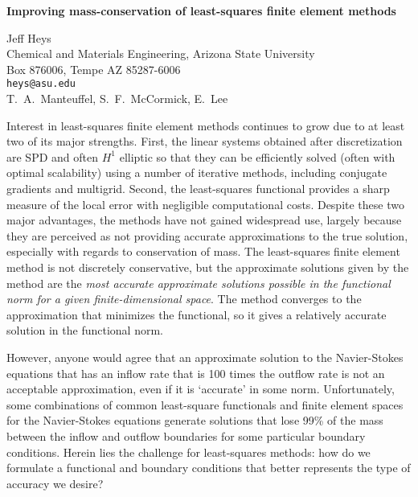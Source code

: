 \documentclass{report}
\begin{document}

\begin{center}
{\large
{\bf Improving mass-conservation of least-squares finite element methods}}

	Jeff Heys \\
	Chemical and Materials Engineering, Arizona State University \\
	Box 876006, Tempe AZ 85287-6006 \\
	{\tt heys@asu.edu} \\
	T.~A.~Manteuffel, S.~F.~McCormick, E.~Lee
\end{center}
Interest in least-squares finite element methods continues
to grow due to at least two of its major strengths. First,
the linear systems obtained after discretization are SPD and
often $H^1$ elliptic so that they can be efficiently solved
(often with optimal scalability) using a number of iterative
methods, including conjugate gradients and multigrid.
Second, the least-squares functional provides a sharp
measure of the local error with negligible computational
costs. Despite these two major advantages, the methods have
not gained widespread use, largely because they are
perceived as not providing accurate approximations to the
true solution, especially with regards to conservation of
mass.
The least-squares finite element method is not
discretely conservative, but the approximate solutions given
by the method are the \emph{most accurate approximate
solutions possible in the functional norm for a given
finite-dimensional space}. The method converges to the
approximation that minimizes the functional, so it gives a
relatively accurate solution in the functional norm.

However, anyone would agree that an approximate solution to
the Navier-Stokes equations that has an inflow rate that is
100 times the outflow rate is not an acceptable
approximation, even if it is `accurate' in some norm.
Unfortunately, some combinations of common least-square
functionals and finite element spaces for the Navier-Stokes
equations generate solutions that lose 99\% of the mass
between the inflow and outflow boundaries for some
particular boundary conditions. Herein lies the challenge
for least-squares methods: how do we formulate a functional
and boundary conditions that better represents the type of
accuracy we desire?
\end{document}

